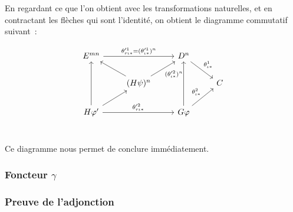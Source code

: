 \begin{pv}
    En regardant ce que l'on obtient avec les transformations naturelles, et en
    contractant les flèches qui sont l'identité, on obtient le diagramme commutatif
    suivant~:

    \[\begin{tikzcd}
        E^{mn}\arrow[rr, "\theta'^1_{r\iota\ast} = (\theta'^1_{\iota\ast})^n"] & &
            D^n\arrow[dr, "\theta^1_{\iota\ast}"] & \\
        & (H\psi)^n\arrow[ur, swap, "(\theta'^2_{\iota\ast})^n"]\arrow[ul] & &
            C \\
        H\phi'\arrow[ur]\arrow[rr, "\theta'^2_{r\iota\ast}"]\arrow[uu] & &
            G\phi\arrow[ur, "\theta^2_{\iota\ast}"]\arrow[uu] & \\
    \end{tikzcd}\]

    Ce diagramme nous permet de conclure immédiatement.
\end{pv}

\subsubsection{Foncteur $\gamma$}


\subsubsection{Preuve de l'adjonction}

